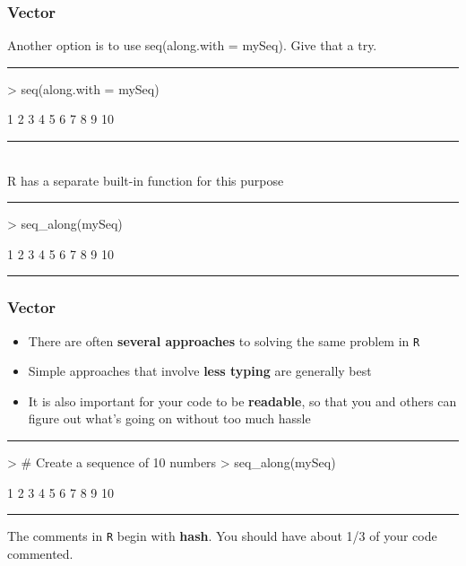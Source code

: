 \documentclass{beamer}
\begin{document}
\begin{frame}[fragile]
	\frametitle{Vector}
	Another option is to use seq(along.with = mySeq). Give that a try.
\rule{\textwidth}{0.4pt}
\begin{Schunk}
\begin{Sinput}
> seq(along.with = mySeq)
\end{Sinput}
\begin{Soutput}
 [1]  1  2  3  4  5  6  7  8  9 10
\end{Soutput}
\end{Schunk}
\rule{\textwidth}{0.4pt}\\
\vspace{20pt}
R has a separate built-in function for this purpose
\rule{\textwidth}{0.4pt}
\begin{Schunk}
\begin{Sinput}
> seq_along(mySeq)
\end{Sinput}
\begin{Soutput}
 [1]  1  2  3  4  5  6  7  8  9 10
\end{Soutput}
\end{Schunk}
\rule{\textwidth}{0.4pt}
\end{frame}

\begin{frame}[fragile]
	\frametitle{Vector}
	\begin{itemize}
	\item There are often \textbf{several approaches} to solving the same problem in \texttt{R}          \item Simple approaches that involve \textbf{less typing} are generally best
	\item It is also important for your code to be \textbf{readable}, so that you and others can figure out what's going on without too much hassle
	\end{itemize}
\rule{\textwidth}{0.4pt}
\begin{Schunk}
\begin{Sinput}
> # Create a sequence of 10 numbers
> seq_along(mySeq)
\end{Sinput}
\begin{Soutput}
 [1]  1  2  3  4  5  6  7  8  9 10
\end{Soutput}
\end{Schunk}
\rule{\textwidth}{0.4pt}
\small The comments in \texttt{R} begin with \textbf{hash}. You should have about 1/3 of your code commented. 
\end{frame}
\end{document}

